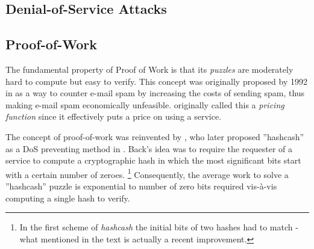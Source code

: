 \subsection{Denial-of-Service Attacks}\label{text:dos}
\begin{comment}

DoS attacks continues to plague internet services even if they are efficaciously protected against intrusive security breaches, as evidenced by the recent attack on Spamhaus \cite{BBC}. A denial of service attack is essentially a targeted effort to prevent a service from servicing legitimate requests by draining the underlying computer resources.Such an attack is executed by having each attacking machine performing only small load of the total work, relying on the cumulative work to overload the target system. 
\\
\\
A DoS attack can generally be divided into two types of strategies:

\textbf{\emph {Brute force attacks}}



The typical DoS attack exploits the server by generating excessive memory and/or CPU utilisation of the server. Popular examples include SYN spoofing attacks which triggers the server to allocate input buffers for connections that never complete initiation as well as SSL attacks in which the server CPU is overloaded with expensive public-key decryption calculations. 
\end{comment}

\subsection{Proof-of-Work}\label{text:pow}


The fundamental property of Proof of Work is that its \emph{puzzles} are moderately hard to compute but easy to verify. This concept was originally proposed by \citeauthor{DworkN92} 1992 in  as a way to counter e-mail spam by increasing the costs of sending spam, thus making e-mail spam economically unfeasible. \citeauthor{DworkN92} originally called this a \emph{pricing function} since it effectively puts a price on using a service.

The concept of proof-of-work was reinvented by \citeauthor{Back02}, who later proposed ''hashcash'' as a DoS preventing method in . Back's idea was to require the requester of a service to compute a cryptographic hash in which the most significant bits start with a certain number of zeroes. \footnote{In the first scheme of \emph{hashcash} the initial bits of two hashes had to match - what mentioned in the text is actually a recent improvement.} Consequently, the average work to solve a ''hashcash'' puzzle is exponential to number of zero bits required vis-à-vis computing a single hash to verify\cite{bitcoin}.

